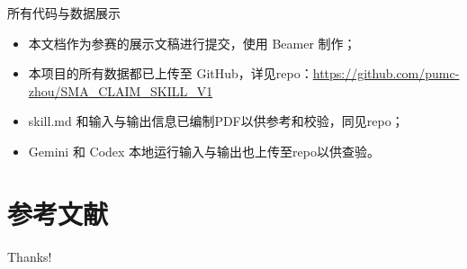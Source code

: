 \documentclass{beamer}
\begin{document}
\begin{frame}[fragile]{所有代码与数据展示}
    \begin{itemize}
        \item 本文档作为参赛的展示文稿进行提交，使用 Beamer 制作；
        \item 本项目的所有数据都已上传至 GitHub，详见repo：\url{https://github.com/pumc-zhou/SMA_CLAIM_SKILL_V1}
        \item skill.md 和输入与输出信息已编制PDF以供参考和校验，同见repo；
        \item Gemini 和 Codex 本地运行输入与输出也上传至repo以供查验。
    \end{itemize}
\end{frame}



\section{参考文献}

\begin{frame}[allowframebreaks]
    
    \footnotesize
\end{frame}

\begin{frame}
    \begin{center}
        {\Huge\calligra Thanks!}
    \end{center}
\end{frame}
\end{document}
